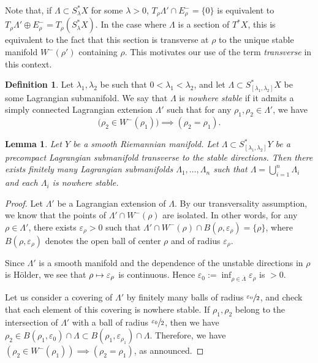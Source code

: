 \documentclass[JEP,XML,SOM,Unicode,published]{cedram}
\newcommand\mto{\mathchoice{\longmapsto}{\mapsto}{\mapsto}{\mapsto}}
\theoremstyle{plain}
\newtheorem{lemma}[theorem]{Lemma}
\theoremstyle{definition}
\newtheorem{definition}[theorem]{Definition}
\begin{document}
Note that, if $\Lambda\subset S^*_\lambda X$ for some $\lambda>0$, $T_\rho\Lambda'\cap E^-_\rho=\{0\}$ is equivalent to $T_\rho\Lambda'\oplus E^-_\rho=T_\rho(S^*_\lambda X)$. In the case where $\Lambda$ is a section of $T^*X$, this is equivalent to the fact that this section is transverse at $\rho$ to the unique stable manifold $W^-(\rho')$ containing $\rho$. This motivates our use of the term \emph{transverse} in this context.

\begin{definition}
Let $\lambda_1,\lambda_2$ be such that $0<\lambda_1<\lambda_2$, and let $\Lambda \subset S^*_{[\lambda_1,\lambda_2]}X$ be some Lagrangian submanifold.
We say that $\Lambda$ is \emph{nowhere stable} if it admits a simply connected Lagrangian extension $\Lambda'$ such that for any $\rho_1, \rho_2\in \Lambda'$, we have
\begin{equation}\label{eq:DefNonStable}
\bigl(\rho_2 \in W^{-}(\rho_1) \bigr) \implies(\rho_2=\rho_1).
\end{equation}
\end{definition}

\begin{lemma}\label{lem:PetitesLag}
Let $Y$ be a smooth Riemannian manifold. Let $\Lambda \subset S^*_{[\lambda_1,\lambda_2]}Y$ be a precompact Lagrangian submanifold transverse to the stable directions. Then there exists finitely many Lagrangian submanifolds $\Lambda_1,\dots, \Lambda_n$ such that $\Lambda= \bigcup_{i=1}^n \Lambda_i$ and each $\Lambda_i$ is nowhere stable.
\end{lemma}

\begin{proof}
Let $\Lambda'$ be a Lagrangian extension of $\Lambda$. By our transversality assumption, we know that the points of $\Lambda'\cap W^-(\rho)$ are isolated. In other words, for any $\rho\in \Lambda'$, there exists $\varepsilon_\rho>0$ such that $\Lambda'\cap W^-(\rho)\cap B(\rho, \varepsilon_\rho) = \{\rho\}$, where $B(\rho, \varepsilon_\rho)$ denotes the open ball of center $\rho$ and of radius $\varepsilon_\rho$.

Since $\Lambda'$ is a smooth manifold and the dependence of the unstable directions in $\rho$ is Hölder, we see that $\rho\mto \varepsilon_\rho$ is continuous. Hence $\varepsilon_0:= \inf_{\rho\in \overline{\Lambda}} \varepsilon_\rho$ is $>0$.

Let us consider a covering of $\Lambda'$ by finitely many balls of radius $\sfrac{\varepsilon_0}{2}$, and check that each element of this covering is nowhere stable. If $\rho_1, \rho_2$ belong to the intersection of $\Lambda'$ with a ball of radius $\sfrac{\varepsilon_0}{2}$, then we have $\rho_2\in B(\rho_1, \varepsilon_0) \cap \Lambda\subset B(\rho_1, \varepsilon_{\rho_1}) \cap \Lambda$. Therefore, we have $(\rho_2\in W^-(\rho_1)) \implies (\rho_2=\rho_1)$, as announced.
\end{proof}
\end{document}
